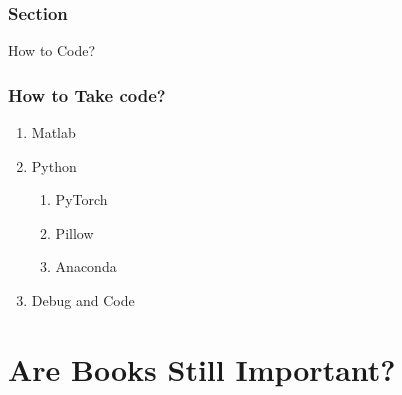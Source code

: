 \documentclass[aspectratio=2516]{beamer}
\begin{document}
\begin{frame}
	\frametitle{ Section \uppercase\expandafter{}}
	
	\begin{center}
		\Large How to Code?
	\end{center}
	
\end{frame}

\begin{frame}
	\frametitle{How to Take code?}
	\begin{enumerate}
		
		\item Matlab
		
		\vspace{0.75cm}
		
		\item Python 
		
		\vspace{0.25cm}
		
		\begin{enumerate}
			\item PyTorch
			
			\vspace{0.25cm}
			
			\item  Pillow
			
			\vspace{0.25cm}
			
			\item  Anaconda 
		\end{enumerate}
		
		\vspace{0.75cm}
		
		\item Debug and Code
		
	\end{enumerate}
\end{frame}


\section{Are Books Still Important?}
\end{document}
